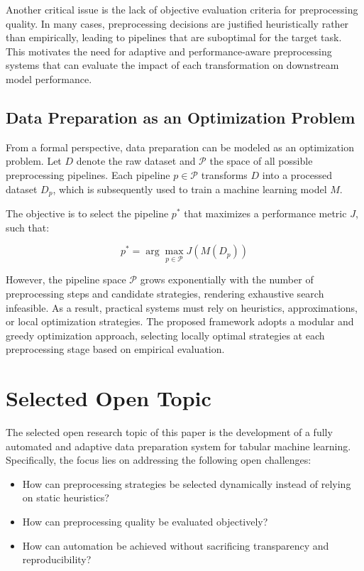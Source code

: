 \documentclass[11pt,a4paper]{article}
\begin{document}
Another critical issue is the lack of objective evaluation criteria for preprocessing quality. In many cases, preprocessing decisions are justified heuristically rather than empirically, leading to pipelines that are suboptimal for the target task. This motivates the need for adaptive and performance-aware preprocessing systems that can evaluate the impact of each transformation on downstream model performance.

\subsection{Data Preparation as an Optimization Problem}

From a formal perspective, data preparation can be modeled as an optimization problem. Let $D$ denote the raw dataset and $\mathcal{P}$ the space of all possible preprocessing pipelines. Each pipeline $p \in \mathcal{P}$ transforms $D$ into a processed dataset $D_p$, which is subsequently used to train a machine learning model $M$.

The objective is to select the pipeline $p^*$ that maximizes a performance metric $J$, such that:

\[
p^* = \arg\max_{p \in \mathcal{P}} J(M(D_p))
\]

However, the pipeline space $\mathcal{P}$ grows exponentially with the number of preprocessing steps and candidate strategies, rendering exhaustive search infeasible. As a result, practical systems must rely on heuristics, approximations, or local optimization strategies. The proposed framework adopts a modular and greedy optimization approach, selecting locally optimal strategies at each preprocessing stage based on empirical evaluation.


\section{Selected Open Topic}

The selected open research topic of this paper is the development of a fully automated and adaptive data preparation system for tabular machine learning. Specifically, the focus lies on addressing the following open challenges:

\begin{itemize}
    \item How can preprocessing strategies be selected dynamically instead of relying on static heuristics?
    \item How can preprocessing quality be evaluated objectively?
    \item How can automation be achieved without sacrificing transparency and reproducibility?
\end{itemize}
\end{document}
